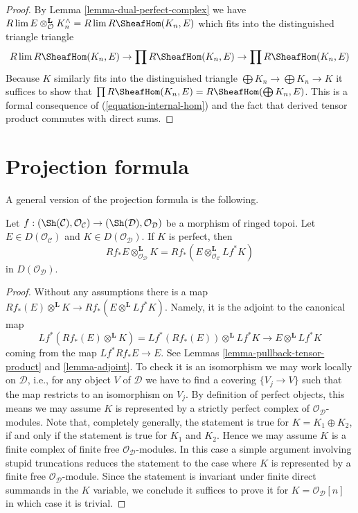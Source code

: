 \begin{proof}
By Lemma \ref{lemma-dual-perfect-complex} we have
$R\lim E \otimes^\mathbf{L}_\mathcal{O} K_n^\wedge =
R\lim R\SheafHom(K_n, E)$
which fits into the distinguished triangle triangle
$$
R\lim R\SheafHom(K_n, E) \to
\prod R\SheafHom(K_n, E) \to
\prod R\SheafHom(K_n, E)
$$
Because $K$ similarly fits into the distinguished triangle
$\bigoplus K_n \to \bigoplus K_n \to K$ it suffices to show that
$\prod R\SheafHom(K_n, E) = R\SheafHom(\bigoplus K_n, E)$.
This is a formal consequence of (\ref{equation-internal-hom})
and the fact that derived tensor product commutes with direct sums.
\end{proof}




\section{Projection formula}
\label{section-projection-formula}

\noindent
A general version of the projection formula is the following.

\begin{lemma}
\label{lemma-projection-formula}
Let $f : (\Sh(\mathcal{C}), \mathcal{O}_\mathcal{C}) \to
(\Sh(\mathcal{D}), \mathcal{O}_\mathcal{D})$ be a morphism of ringed topoi.
Let $E \in D(\mathcal{O}_\mathcal{C})$ and $K \in D(\mathcal{O}_\mathcal{D})$.
If $K$ is perfect, then
$$
Rf_*E \otimes^\mathbf{L}_{\mathcal{O}_\mathcal{D}} K =
Rf_*(E \otimes^\mathbf{L}_{\mathcal{O}_\mathcal{C}} Lf^*K)
$$
in $D(\mathcal{O}_\mathcal{D})$.
\end{lemma}

\begin{proof}
Without any assumptions there is a map
$Rf_*(E) \otimes^\mathbf{L} K \to Rf_*(E \otimes^\mathbf{L} Lf^*K)$.
Namely, it is the adjoint to the canonical map
$$
Lf^*(Rf_*(E) \otimes^\mathbf{L} K) = Lf^*(Rf_*(E)) \otimes^\mathbf{L} Lf^*K
\longrightarrow
E \otimes^\mathbf{L} Lf^*K
$$
coming from the map $Lf^*Rf_*E \to E$. See Lemmas
\ref{lemma-pullback-tensor-product} and \ref{lemma-adjoint}.
To check it is an isomorphism we may work locally on $\mathcal{D}$, i.e.,
for any object $V$ of $\mathcal{D}$ we have to find a covering $\{V_j \to V\}$
such that the map restricts to an isomorphism on $V_j$. By definition
of perfect objects, this means we may assume $K$ is represented by
a strictly perfect complex of $\mathcal{O}_\mathcal{D}$-modules.
Note that, completely generally, the statement is true for
$K = K_1 \oplus K_2$, if and only if the statement is true for
$K_1$ and $K_2$. Hence we may assume $K$ is a finite
complex of finite free $\mathcal{O}_\mathcal{D}$-modules.
In this case a simple argument involving stupid truncations reduces
the statement to the case where $K$ is represented by a finite
free $\mathcal{O}_\mathcal{D}$-module. Since the statement is invariant
under finite direct summands in the $K$ variable, we conclude
it suffices to prove it for $K = \mathcal{O}_\mathcal{D}[n]$
in which case it is trivial.
\end{proof}



